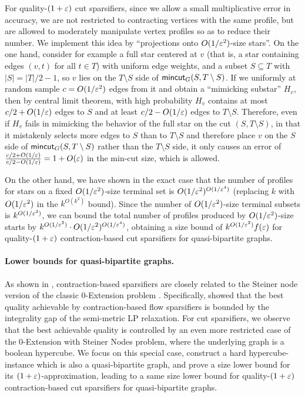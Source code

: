 For quality-$(1+{\varepsilon})$ cut sparsifiers, since we allow a small multiplicative error in accuracy, we are not restricted to contracting vertices with the same profile, but are allowed to moderately manipulate vertex profiles so as to reduce their number. We implement this idea by ``projections onto $O(1/{\varepsilon}^2)$-size stars''. On the one hand, consider for example a full star centered at $v$ (that is, a star containing edges $(v,t)$ for all $t\in T$) with uniform edge weights, and a subset $S\subseteq T$ with $|S|=|T|/2-1$, so $v$ lies on the $T\setminus S$ side of $\mathsf{mincut}_G(S,T\setminus S)$. If we uniformly at random sample $c=O(1/{\varepsilon}^2)$ edges from it and obtain a ``mimicking substar'' $H_v$, then by central limit theorem, with high probability $H_v$ contains at most $c/2+O(1/{\varepsilon})$ edges to $S$ and at least $c/2-O(1/{\varepsilon})$ edges to $T\setminus S$. Therefore, even if $H_v$ fails in mimicking the behavior of the full star on the cut $(S,T\setminus S)$, in that it mistakenly selects more edges to $S$ than to $T\setminus S$ and therefore place $v$ on the $S$ side of $\mathsf{mincut}_G(S,T\setminus S)$ rather than the $T\setminus S$ side, it only causes an error of $\frac{c/2+O(1/{\varepsilon})}{c/2-O(1/{\varepsilon})}=1+O({\varepsilon})$ in the min-cut size, which is allowed.

On the other hand, we have shown in the exact case that the number of profiles for stars on a fixed $O(1/{\varepsilon}^2)$-size terminal set is $O(1/{\varepsilon}^2)^{O(1/{\varepsilon}^4)}$ (replacing $k$ with $O(1/{\varepsilon}^2)$ in the $k^{O(k^2)}$ bound). Since the number of $O(1/{\varepsilon}^2)$-size terminal subsets is $k^{O(1/{\varepsilon}^2)}$, we can bound the total number of profiles produced by $O(1/{\varepsilon}^2)$-size starts by 
 $k^{O(1/{\varepsilon}^2)}\cdot O(1/{\varepsilon}^2)^{O(1/{\varepsilon}^4)}$, obtaining a size bound of $k^{O(1/{\varepsilon}^2)} f({\varepsilon})$ for quality-$(1+{\varepsilon})$ contraction-based cut sparsifiers for quasi-bipartite graphs.



\paragraph{Lower bounds for quasi-bipartite graphs.}
As shown in \cite{chen20241+,chen2024lower}, contraction-based sparsifiers are closely related to the Steiner node version of the classic $0$-Extension problem \cite{karzanov1998minimum}. Specifically, \cite{chen20241+} showed that the best quality achievable by contraction-based flow sparsifiers is bounded by the integrality gap of the semi-metric LP relaxation. For cut sparsifiers, we observe that the best achievable quality is controlled by an even more restricted case of the $0$-Extension with Steiner Nodes problem, where the underlying graph is a boolean hypercube. We focus on this special case, construct a hard hypercube-instance which is also a quasi-bipartite graph, and prove a size lower bound for its $(1+{\varepsilon})$-approximation, leading to a same size lower bound for quality-$(1+{\varepsilon})$ contraction-based cut sparsifiers for quasi-bipartite graphs.













